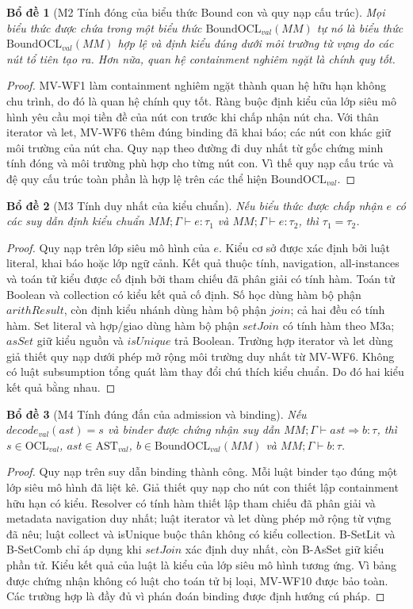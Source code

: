 \documentclass[11pt,a4paper]{article}
\newtheorem{lemma}{Bổ đề}
\theoremstyle{definition}
\newcommand{\OCLval}{\mathrm{OCL}_{val}}
\newcommand{\ASTval}{\mathrm{AST}_{val}}
\newcommand{\BoundOCLval}{\mathrm{BoundOCL}_{val}}
\begin{document}
\begin{lemma}[M2 Tính đóng của biểu thức Bound con và quy nạp cấu trúc]
Mọi biểu thức được chứa trong một biểu thức $\BoundOCLval(MM)$ tự nó là biểu thức
$\BoundOCLval(MM)$ hợp lệ và định kiểu đúng dưới môi trường từ vựng do các nút tổ
tiên tạo ra. Hơn nữa, quan hệ containment nghiêm ngặt là chính quy tốt.
\end{lemma}
\begin{proof}
MV-WF1 làm containment nghiêm ngặt thành quan hệ hữu hạn không chu trình, do đó
là quan hệ chính quy tốt. Ràng buộc định kiểu của lớp siêu mô hình yêu cầu mọi
tiền đề của nút con trước khi chấp nhận nút cha. Với thân iterator và let,
MV-WF6 thêm đúng binding đã khai báo; các nút con khác giữ môi trường của nút
cha. Quy nạp theo đường đi duy nhất từ gốc chứng minh tính đóng và môi trường
phù hợp cho từng nút con. Vì thế quy nạp cấu trúc và đệ quy cấu trúc toàn phần
là hợp lệ trên các thể hiện $\BoundOCLval$.
\end{proof}

\begin{lemma}[M3 Tính duy nhất của kiểu chuẩn]
Nếu biểu thức được chấp nhận $e$ có các suy dẫn định kiểu chuẩn
$MM;\Gamma\vdash e:\tau_1$ và $MM;\Gamma\vdash e:\tau_2$, thì
$\tau_1=\tau_2$.
\end{lemma}
\begin{proof}
Quy nạp trên lớp siêu mô hình của $e$. Kiểu cơ sở được xác định bởi luật
literal, khai báo hoặc lớp ngữ cảnh. Kết quả thuộc tính, navigation,
all-instances và toán tử kiểu được cố định bởi tham chiếu đã phân giải có tính
hàm. Toán tử Boolean và collection có kiểu kết quả cố định. Số học dùng hàm bộ
phận $arithResult$, còn định kiểu nhánh dùng hàm bộ phận $join$; cả hai đều có
tính hàm. Set literal và hợp/giao dùng hàm bộ phận $setJoin$ có tính hàm theo
M3a; $asSet$ giữ kiểu nguồn và $isUnique$ trả Boolean. Trường hợp iterator và let dùng giả thiết quy nạp dưới phép mở rộng
môi trường duy nhất từ MV-WF6. Không có luật subsumption tổng quát làm thay đổi
chú thích kiểu chuẩn. Do đó hai kiểu kết quả bằng nhau.
\end{proof}

\begin{lemma}[M4 Tính đúng đắn của admission và binding]
Nếu $decode_{val}(ast)=s$ và binder được chứng nhận suy dẫn
$MM;\Gamma\vdash ast\Rightarrow b:\tau$, thì $s\in\OCLval$,
$ast\in\ASTval$, $b\in\BoundOCLval(MM)$ và $MM;\Gamma\vdash b:\tau$.
\end{lemma}
\begin{proof}
Quy nạp trên suy dẫn binding thành công. Mỗi luật binder tạo đúng một lớp siêu
mô hình đã liệt kê. Giả thiết quy nạp cho nút con thiết lập containment hữu hạn
có kiểu. Resolver có tính hàm thiết lập tham chiếu đã phân giải và metadata
navigation duy nhất; luật iterator và let dùng phép mở rộng từ vựng đã nêu;
luật collect và isUnique buộc thân không có kiểu collection. B-SetLit và
B-SetComb chỉ áp dụng khi $setJoin$ xác định duy nhất, còn B-AsSet giữ kiểu
phần tử. Kiểu kết quả của luật là kiểu
của lớp siêu mô hình tương ứng. Vì bảng được chứng nhận không có luật cho toán
tử bị loại, MV-WF10 được bảo toàn. Các trường hợp là đầy đủ vì phán đoán binding
được định hướng cú pháp.
\end{proof}
\end{document}
